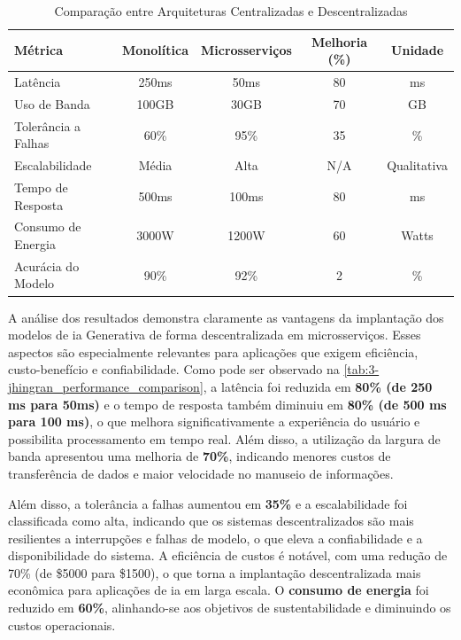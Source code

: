 \begin{table}[H]
\centering
\caption{Comparação entre Arquiteturas Centralizadas e Descentralizadas}
\begin{tabularx}{\textwidth}{| X | c | c | c | c |}
\hline
\textbf{Métrica} & \textbf{Monolítica} & \textbf{Microsserviços} & \textbf{Melhoria (\%)} & \textbf{Unidade} \\
\hline
Latência                  & 250ms   & 50ms    & 80 & ms \\
\hline
Uso de Banda              & 100GB   & 30GB    & 70 & GB \\
\hline
Tolerância a Falhas       & 60\%    & 95\%    & 35 & \% \\
\hline
Escalabilidade            & Média   & Alta    & N/A & Qualitativa \\
\hline
Tempo de Resposta         & 500ms   & 100ms   & 80 & ms \\
\hline
Consumo de Energia          & 3000W   & 1200W   & 60 & Watts \\
\hline
Acurácia do Modelo        & 90\%    & 92\%    & 2  & \% \\
\hline
\end{tabularx}
\label{tab:3-jhingran_performance_comparison}
\end{table}


A análise dos resultados demonstra claramente as vantagens da implantação dos modelos de \gls{ia} Generativa de forma descentralizada em microsserviços. Esses aspectos são especialmente relevantes para aplicações que exigem eficiência, custo-benefício e confiabilidade. Como pode ser observado na \autoref{tab:3-jhingran_performance_comparison}, a latência foi reduzida em\textbf{ 80\% (de 250 ms para 50ms)} e o tempo de resposta também diminuiu em \textbf{80\% (de 500 ms para 100 ms)}, o que melhora significativamente a experiência do usuário e possibilita processamento em tempo real. Além disso, a utilização da largura de banda apresentou uma melhoria de \textbf{70\%}, indicando menores custos de transferência de dados e maior velocidade no manuseio de informações.

Além disso, a tolerância a falhas aumentou em \textbf{35\%} e a escalabilidade foi classificada como alta, indicando que os sistemas descentralizados são mais resilientes a interrupções e falhas de modelo, o que eleva a confiabilidade e a disponibilidade do sistema. A eficiência de custos é notável, com uma redução de 70\% (de \$5000 para \$1500), o que torna a implantação descentralizada mais econômica para aplicações de \gls{ia} em larga escala. O \textbf{consumo de energia} foi reduzido em\textbf{ 60\%}, alinhando-se aos objetivos de sustentabilidade e diminuindo os custos operacionais. 

